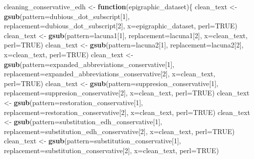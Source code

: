 \documentclass[]{article}
\newenvironment{Shaded}{\begin{snugshade}}{\end{snugshade}}
\newcommand{\ControlFlowTok}[1]{\textcolor[rgb]{0.13,0.29,0.53}{\textbf{#1}}}
\newcommand{\DataTypeTok}[1]{\textcolor[rgb]{0.13,0.29,0.53}{#1}}
\newcommand{\DecValTok}[1]{\textcolor[rgb]{0.00,0.00,0.81}{#1}}
\newcommand{\KeywordTok}[1]{\textcolor[rgb]{0.13,0.29,0.53}{\textbf{#1}}}
\newcommand{\NormalTok}[1]{#1}
\newcommand{\OtherTok}[1]{\textcolor[rgb]{0.56,0.35,0.01}{#1}}
\newcommand{\StringTok}[1]{\textcolor[rgb]{0.31,0.60,0.02}{#1}}
\begin{document}
\begin{Shaded}
\begin{Highlighting}[]
\NormalTok{cleaning_conservative_edh <-}\StringTok{ }\ControlFlowTok{function}\NormalTok{(epigraphic_dataset)\{}
\NormalTok{  clean_text <-}\StringTok{ }\KeywordTok{gsub}\NormalTok{(}\DataTypeTok{pattern=}\NormalTok{dubious_dot_subscript[}\DecValTok{1}\NormalTok{], }\DataTypeTok{replacement=}\NormalTok{dubious_dot_subscript[}\DecValTok{2}\NormalTok{], }\DataTypeTok{x=}\NormalTok{epigraphic_dataset, }\DataTypeTok{perl=}\OtherTok{TRUE}\NormalTok{)}
\NormalTok{  clean_text <-}\StringTok{ }\KeywordTok{gsub}\NormalTok{(}\DataTypeTok{pattern=}\NormalTok{lacuna1[}\DecValTok{1}\NormalTok{], }\DataTypeTok{replacement=}\NormalTok{lacuna1[}\DecValTok{2}\NormalTok{], }\DataTypeTok{x=}\NormalTok{clean_text, }\DataTypeTok{perl=}\OtherTok{TRUE}\NormalTok{)}
\NormalTok{  clean_text <-}\StringTok{ }\KeywordTok{gsub}\NormalTok{(}\DataTypeTok{pattern=}\NormalTok{lacuna2[}\DecValTok{1}\NormalTok{], }\DataTypeTok{replacement=}\NormalTok{lacuna2[}\DecValTok{2}\NormalTok{], }\DataTypeTok{x=}\NormalTok{clean_text, }\DataTypeTok{perl=}\OtherTok{TRUE}\NormalTok{)}
\NormalTok{  clean_text <-}\StringTok{ }\KeywordTok{gsub}\NormalTok{(}\DataTypeTok{pattern=}\NormalTok{expanded_abbreviations_conservative[}\DecValTok{1}\NormalTok{], }\DataTypeTok{replacement=}\NormalTok{expanded_abbreviations_conservative[}\DecValTok{2}\NormalTok{], }\DataTypeTok{x=}\NormalTok{clean_text, }\DataTypeTok{perl=}\OtherTok{TRUE}\NormalTok{)}
\NormalTok{  clean_text <-}\StringTok{ }\KeywordTok{gsub}\NormalTok{(}\DataTypeTok{pattern=}\NormalTok{suppresion_conservative[}\DecValTok{1}\NormalTok{], }\DataTypeTok{replacement=}\NormalTok{suppresion_conservative[}\DecValTok{2}\NormalTok{], }\DataTypeTok{x=}\NormalTok{clean_text, }\DataTypeTok{perl=}\OtherTok{TRUE}\NormalTok{)}
\NormalTok{  clean_text <-}\StringTok{ }\KeywordTok{gsub}\NormalTok{(}\DataTypeTok{pattern=}\NormalTok{restoration_conservative[}\DecValTok{1}\NormalTok{], }\DataTypeTok{replacement=}\NormalTok{restoration_conservative[}\DecValTok{2}\NormalTok{], }\DataTypeTok{x=}\NormalTok{clean_text, }\DataTypeTok{perl=}\OtherTok{TRUE}\NormalTok{)}
\NormalTok{  clean_text <-}\StringTok{ }\KeywordTok{gsub}\NormalTok{(}\DataTypeTok{pattern=}\NormalTok{substitution_edh_conservative[}\DecValTok{1}\NormalTok{], }\DataTypeTok{replacement=}\NormalTok{substitution_edh_conservative[}\DecValTok{2}\NormalTok{], }\DataTypeTok{x=}\NormalTok{clean_text, }\DataTypeTok{perl=}\OtherTok{TRUE}\NormalTok{)}
\NormalTok{  clean_text <-}\StringTok{ }\KeywordTok{gsub}\NormalTok{(}\DataTypeTok{pattern=}\NormalTok{substitution_conservative[}\DecValTok{1}\NormalTok{], }\DataTypeTok{replacement=}\NormalTok{substitution_conservative[}\DecValTok{2}\NormalTok{], }\DataTypeTok{x=}\NormalTok{clean_text, }\DataTypeTok{perl=}\OtherTok{TRUE}\NormalTok{)}

\end{Highlighting}
\end{Shaded}
\end{document}
